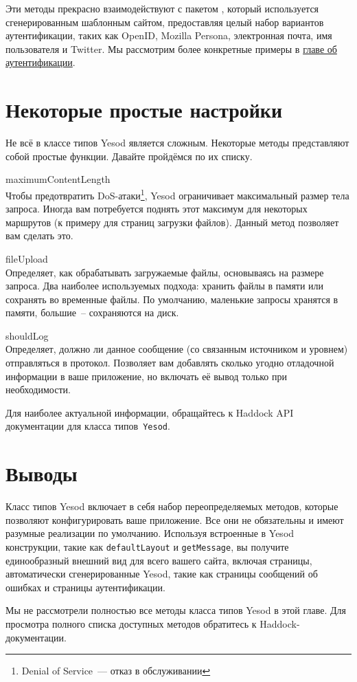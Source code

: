 Эти методы прекрасно взаимодействуют с пакетом
,
который используется сгенерированным шаблонным сайтом, предоставляя целый набор
вариантов аутентификации, таких как OpenID, Mozilla Persona, электронная почта, имя
пользователя и Twitter. Мы рассмотрим более конкретные примеры в
\hyperref[chap:auth]{главе об аутентификации}.

\section {Некоторые простые настройки}

Не всё в классе типов Yesod является сложным. Некоторые методы представляют
собой простые функции. Давайте пройдёмся по их списку.

\begin{description}
    \item {maximumContentLength} \hfill \\
        Чтобы предотвратить DoS-атаки\footnote{Denial of Service~--- отказ в
            обслуживании}, Yesod ограничивает максимальный размер тела запроса.
        Иногда вам потребуется поднять этот максимум для некоторых маршрутов (к
        примеру для страниц загрузки файлов). Данный метод позволяет вам
        сделать это.

    \item {fileUpload} \hfill \\
        Определяет, как обрабатывать загружаемые файлы, основываясь на размере
        запроса. Два наиболее используемых подхода: хранить файлы в памяти
        или сохранять во временные файлы. По умолчанию, маленькие запросы
        хранятся в памяти, большие~-- сохраняются на диск.

    \item {shouldLog} \hfill \\
        Определяет, должно ли данное сообщение (со связанным источником и
        уровнем) отправляться в протокол. Позволяет вам добавлять сколько
        угодно отладочной информации в ваше приложение, но включать её вывод
        только при необходимости.
\end{description}

Для наиболее актуальной информации, обращайтесь к Haddock API документации для
класса типов~\lstinline!Yesod!.

\section {Выводы}

Класс типов Yesod включает в себя набор переопределяемых методов, которые
позволяют конфигурировать ваше приложение. Все они не обязательны и имеют
разумные реализации по умолчанию. Используя встроенные в Yesod конструкции,
такие как \lstinline!defaultLayout! и \lstinline!getMessage!, вы получите
единообразный внешний вид для всего вашего сайта, включая страницы,
автоматически сгенерированные Yesod, такие как страницы сообщений об ошибках и
страницы аутентификации.

Мы не рассмотрели полностью все методы класса типов Yesod в этой главе. Для
просмотра полного списка доступных методов обратитесь к Haddock-документации.
